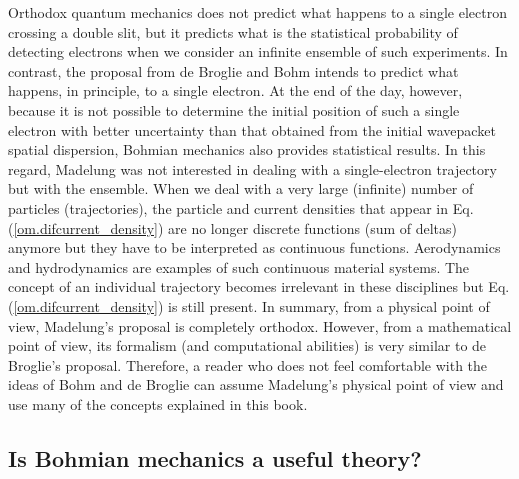 \documentclass[onecolumn,nofootinbib, secnumarabic, amsmath, nobibnotes,12pt,aps,pra]{revtex4-1}
\newcommand{\eref}[1]{Eq. (\ref{#1})}
\begin{document}
Orthodox quantum mechanics does not predict what happens to a single electron crossing a double slit, but it predicts what is the statistical probability of detecting electrons when we consider an infinite ensemble of such experiments. In contrast, the proposal from de Broglie and Bohm intends to predict what happens, in principle, to a single electron. At the end of the day, however, because it is not possible to determine the initial position of such a single electron with better uncertainty than that obtained from the initial wavepacket spatial dispersion, Bohmian mechanics also provides statistical results.
In this regard, Madelung was not interested in dealing with a single-electron trajectory but with the ensemble. When we deal with a very large (infinite) number of particles (trajectories), the particle and current densities that appear in \eref{om.difcurrent_density} are no longer discrete functions (sum of deltas) anymore but they have to be interpreted as continuous functions. Aerodynamics and hydrodynamics are examples of such continuous material systems. The concept of an individual trajectory becomes irrelevant in these disciplines but \eref{om.difcurrent_density} is still present. In summary, from a physical point of view, Madelung's proposal is completely orthodox. However, from a mathematical point of view, its formalism (and computational abilities) is very similar to de Broglie's proposal. Therefore, a reader who does not feel comfortable with the ideas of Bohm and de Broglie can assume Madelung's physical point of view and use many of the concepts explained in this book.

\vspace*{-6pt}
\subsection{Is Bohmian mechanics a useful theory?}\label{om.sec_intro.10}
\end{document}
